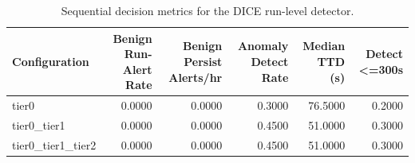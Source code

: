 \begin{table}[t]
\centering
\caption{Sequential decision metrics for the DICE run-level detector.}
\label{tab:dice_sequential_metrics}
\footnotesize
\begin{tabular}{lrrrrr}
\toprule
Configuration & Benign Run-Alert Rate & Benign Persist Alerts/hr & Anomaly Detect Rate & Median TTD (s) & Detect <=300s \\
\midrule
tier0 & 0.0000 & 0.0000 & 0.3000 & 76.5000 & 0.2000 \\
tier0_tier1 & 0.0000 & 0.0000 & 0.4500 & 51.0000 & 0.3000 \\
tier0_tier1_tier2 & 0.0000 & 0.0000 & 0.4500 & 51.0000 & 0.3000 \\
\bottomrule
\end{tabular}

\end{table}
